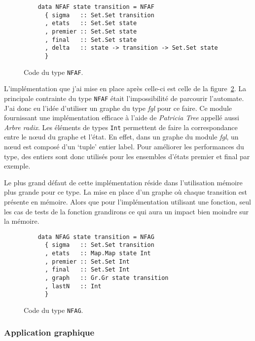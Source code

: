 \begin{figure}[H]
    \begin{verbatim}
    data NFAF state transition = NFAF
      { sigma   :: Set.Set transition
      , etats   :: Set.Set state
      , premier :: Set.Set state
      , final   :: Set.Set state
      , delta   :: state -> transition -> Set.Set state
      }
  \end{verbatim}
    \caption{Code du type \texttt{NFAF}.}\label{fig:codeNFAF}
\end{figure}

\vphantom{}

L'implémentation que j'ai mise en place après celle-ci est celle de la
figure~\ref{fig:codeNFAG}. La principale contrainte du type
\texttt{NFAF} était l'impossibilité de parcourir l'automate. J'ai
donc eu l'idée d'utiliser un graphe du type \textit{fgl} pour ce faire. Ce module
fournissant une implémentation efficace à l'aide de \textit{Patricia Tree}
appellé aussi \textit{Arbre radix}. Les éléments de types
\texttt{Int} permettent de faire la correspondance entre le n\oe ud
du graphe et l'état. En effet, dans un graphe du module \textit{fgl}, un n\oe ud
est composé d'un `tuple' entier label. Pour améliorer les performances du type,
des entiers sont donc utilisés pour les ensembles d'états premier et final par
exemple.

\vphantom{}

Le plus grand défaut de cette implémentation réside dans l'utilisation
mémoire plus grande pour ce type. La mise en place d'un graphe où chaque
transition est présente en mémoire. Alors que pour l'implémentation utilisant
une fonction, seul les cas de tests de la fonction grandirons ce qui aura un
impact bien moindre sur la mémoire.

\begin{figure}[H]
    \begin{verbatim}
    data NFAG state transition = NFAG
      { sigma   :: Set.Set transition
      , etats   :: Map.Map state Int
      , premier :: Set.Set Int
      , final   :: Set.Set Int
      , graph   :: Gr.Gr state transition
      , lastN   :: Int
      }
  \end{verbatim}
    \caption{Code du type \texttt{NFAG}.}\label{fig:codeNFAG}
\end{figure}

\subsubsection{Application graphique}

